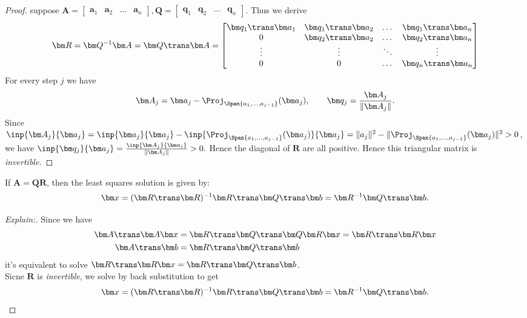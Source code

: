 \begin{proof}
suppose $\bm A=\begin{bmatrix}
\bm a_1&\bm a_2&\dots&\bm a_n
\end{bmatrix}, \bm Q=\begin{bmatrix}
\bm q_1&\bm q_2&\dots&\bm q_n
\end{bmatrix}$.
 Thus we derive \[\bm R=\bm Q^{-1}\bm A=\bm Q\trans\bm A=\begin{bmatrix}
\bm q_1\trans\bm a_1&\bm q_1\trans\bm a_2&\dots&\bm q_1\trans\bm a_n\\
0&\bm q_2\trans\bm a_2&\dots&\bm q_2\trans\bm a_n\\
\vdots&\vdots&\ddots&\vdots\\
0&0&\dots&\bm q_n\trans\bm a_n
\end{bmatrix}
\]
For every step $j$ we have 
\[\bm A_j=\bm a_j-\Proj_{\Span\{a_1,\dots,a_{j-1}\}}( \bm a_j),\qquad \bm q_j=\frac{\bm A_j}{\|\bm A_j\|}.
\]
Since $\inp{\bm A_j}{\bm a_j}=\inp{\bm a_j}{\bm a_j}-\inp{\Proj_{\Span\{a_1,\dots,a_{j-1}\}}(\bm a_j)}{\bm a_j}=\|a_j\|^2-\|\Proj_{\Span\{a_1,\dots,a_{j-1}\}}(\bm a_j)\|^2>0$, we have $\inp{\bm q_j}{\bm a_j}=\frac{\inp{\bm A_j}{\bm a_j}}{\|\bm A_j\|}>0.$ Hence the diagonal of $\bm R$ are all positive. Hence this triangular matrix is \textit{invertible.}
\end{proof}
\begin{proposition}
If $\bm A=\bm{QR}$, then the least squares solution is given by: 
\[
\bm x=(\bm R\trans\bm R)^{-1}\bm R\trans\bm Q\trans\bm b=\bm R^{-1}\bm Q\trans\bm b.
\]
\end{proposition}
\begin{proof}[Explain:]
Since we have
\[
\begin{aligned}
\bm A\trans\bm A\bm x&=\bm R\trans\bm Q\trans\bm Q\bm R\bm x=\bm R\trans\bm R\bm x\\
\bm A\trans\bm b&=\bm R\trans\bm Q\trans\bm b
\end{aligned}
\]
it's equivalent to solve $\bm R\trans\bm R\bm x=\bm R\trans\bm Q\trans\bm b$.\\
Sicne $\bm R$ is \textit{invertible}, we solve by back substitution to get
\[
\bm x=(\bm R\trans\bm R)^{-1}\bm R\trans\bm Q\trans\bm b=\bm R^{-1}\bm Q\trans\bm b.
\]
\end{proof}
